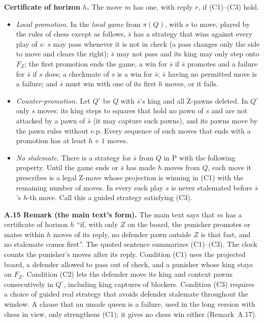 \textbf{Certificate of horizon $h$.} The move $m$ has one, with reply $r$, if (C1)--(C3) hold.
\begin{itemize}
\item[(C1)] \emph{Local promotion.} In the \emph{local game} from $\pi(Q)$, with $s$ to move, played by the rules of chess
except as follows, $\bar s$ has a strategy that wins against every play of $s$: $s$ may pass whenever it is not in check
(a pass changes only the side to move and clears the right); $\bar s$ may not pass and its king may only step onto $F_Z$;
the first promotion ends the game, a win for $\bar s$ if $\bar s$ promotes and a failure for $\bar s$ if $s$ does; a
checkmate of $s$ is a win for $\bar s$; $\bar s$ having no permitted move is a failure; and $\bar s$ must win with one of
its first $h$ moves, or it fails.
\item[(C2)] \emph{Counter-promotion.} Let $Q^\circ$ be $Q$ with $\bar s$'s king and all Z-pawns deleted. In $Q^\circ$
only $s$ moves: its king steps to squares that hold no pawn of $s$ and are not attacked by a pawn of $\bar s$ (it may
capture such pawns), and its pawns move by the pawn rules without e.p. Every sequence of such moves that ends with a
promotion has at least $h+1$ moves.
\item[(C3)] \emph{No stalemate.} There is a strategy for $\bar s$ from
$Q$ in $\mathrm{P}$ with the following property. Until the game ends or
$\bar s$ has made $h$ moves from $Q$, each move it prescribes is a legal
Z-move whose projection is winning in (C1) with the remaining number
of moves. In every such play $s$ is never stalemated before $\bar s$'s
$h$-th move. Call this a guided strategy satisfying (C3).
\end{itemize}

\textbf{A.15 Remark (the main text's form).} The main text says that $m$ has a certificate of horizon $h$ ``if, with
only $Z$ on the board, the punisher promotes or mates within $h$ moves of its reply, no defender pawn outside $Z$ is that
fast, and no stalemate comes first''. The quoted sentence summarizes (C1)--(C3). The clock counts the
punisher's moves after its reply. Condition (C1) uses the projected board,
a defender allowed to pass out of check, and a punisher whose king stays
on $F_Z$. Condition (C2) lets the defender move its king and context
pawns consecutively in $Q^\circ$, including king captures of blockers.
Condition (C3) requires a choice of guided real strategy that avoids
defender stalemate throughout the window. A clause that an unsafe queen is a failure, used in the long version with chess in view, only strengthens
(C1); it gives no chess win either (Remark~A.17).

